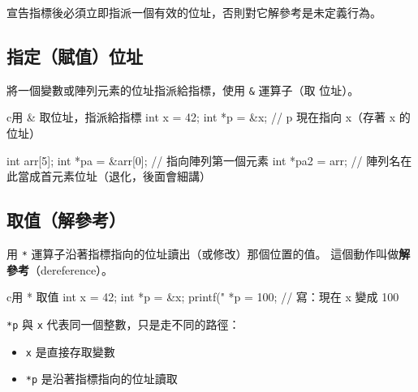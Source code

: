 宣告指標後必須立即指派一個有效的位址，否則對它解參考是未定義行為。

\subsection{指定（賦值）位址}

將一個變數或陣列元素的位址指派給指標，使用 \texttt{\&} 運算子（取
位址）。

\begin{code}{c}{用 \& 取位址，指派給指標}
int x = 42;
int *p = &x;      // p 現在指向 x（存著 x 的位址）

int arr[5];
int *pa = &arr[0];  // 指向陣列第一個元素
int *pa2 = arr;     // 陣列名在此當成首元素位址（退化，後面會細講）
\end{code}

\subsection{取值（解參考）}

用 \texttt{*} 運算子沿著指標指向的位址讀出（或修改）那個位置的值。
這個動作叫做\textbf{解參考}（dereference）。

\begin{code}{c}{用 * 取值}
int x = 42;
int *p = &x;
printf("%
*p = 100;             // 寫：現在 x 變成 100
\end{code}

\texttt{*p} 與 \texttt{x} 代表同一個整數，只是走不同的路徑：
\begin{itemize}
  \item \texttt{x} 是直接存取變數
  \item \texttt{*p} 是沿著指標指向的位址讀取
\end{itemize}

\begin{center}
\label{fig:ch09-pointer-basic}
\end{center}

